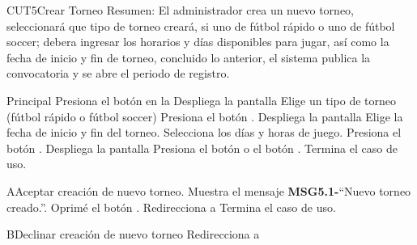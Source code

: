 
	\begin{UseCase}{CUT5}{Crear Torneo}{
		Resumen: El administrador crea un nuevo torneo, seleccionará que tipo de torneo creará, si uno de fútbol rápido o uno de fútbol soccer; debera ingresar los horarios y días disponibles para jugar, así como la fecha de inicio y fin de torneo, concluido lo anterior, el sistema publica la convocatoria y se abre el periodo de registro.	}
	\end{UseCase}
	\newpage
	\begin{UCtrayectoria}{Principal}
	\UCpaso[\UCactor] Presiona el botón  en la 
	\UCpaso Despliega la pantalla 
	\UCpaso[\UCactor] Elige un tipo de torneo (fútbol rápido o fútbol soccer)	
	\UCpaso[\UCactor] Presiona el botón .	
	\UCpaso Despliega la pantalla 
	\UCpaso[\UCactor] Elige la fecha de inicio y fin del torneo. Selecciona los días y horas de juego.
	\UCpaso[\UCactor] Presiona el botón .	
	\UCpaso  Despliega la pantalla 
	\UCpaso[\UCactor] Presiona el botón  o el botón .  	
	\UCpaso Termina el caso de uso.
\end{UCtrayectoria}

\begin{UCtrayectoriaA}{A}{Aceptar creación de nuevo torneo.}
	\UCpaso Muestra el mensaje {\bf MSG5.1-}``Nuevo torneo creado.''.
	\UCpaso[\UCactor] Oprimé el botón .
	\UCpaso Redirecciona a 
	\UCpaso[] Termina el caso de uso.
	\end{UCtrayectoriaA}

	\begin{UCtrayectoriaA}{B}{Declinar creación de nuevo torneo}
		\UCpaso Redirecciona a 
	\end{UCtrayectoriaA}


